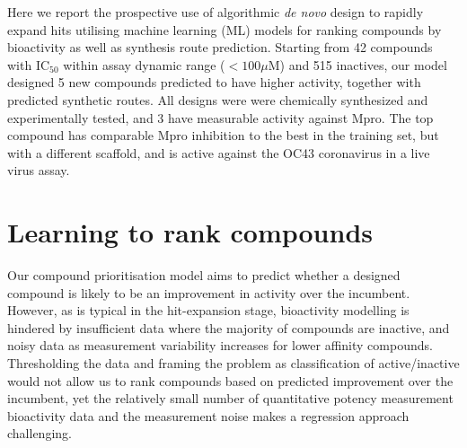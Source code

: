 Here we report the prospective use of algorithmic \emph{de novo} design to rapidly expand hits utilising machine learning (ML) models for ranking compounds by bioactivity as well as synthesis route prediction. Starting from 42 compounds with $\mathrm{IC}_{50}$ within assay dynamic range ($<100 \mu$M) and 515 inactives, our model designed 5 new compounds predicted to have higher activity, together with predicted synthetic routes. All designs were were chemically synthesized and experimentally tested, and 3 have measurable activity against Mpro. The top compound has comparable Mpro inhibition to the best in the training set, but with a different scaffold, and is active against the OC43 coronavirus in a live virus assay.


\section{Learning to rank compounds}
Our compound prioritisation model aims to predict whether a designed compound is likely to be an improvement in activity over the incumbent. However, as is typical in the hit-expansion stage, bioactivity modelling is hindered by insufficient data where the majority of compounds are inactive, and noisy data as measurement variability increases for lower affinity compounds. Thresholding the data and framing the problem as classification of active/inactive would not allow us to rank compounds based on predicted improvement over the incumbent, yet the relatively small number of quantitative potency measurement bioactivity data and the measurement noise makes a regression approach challenging.


